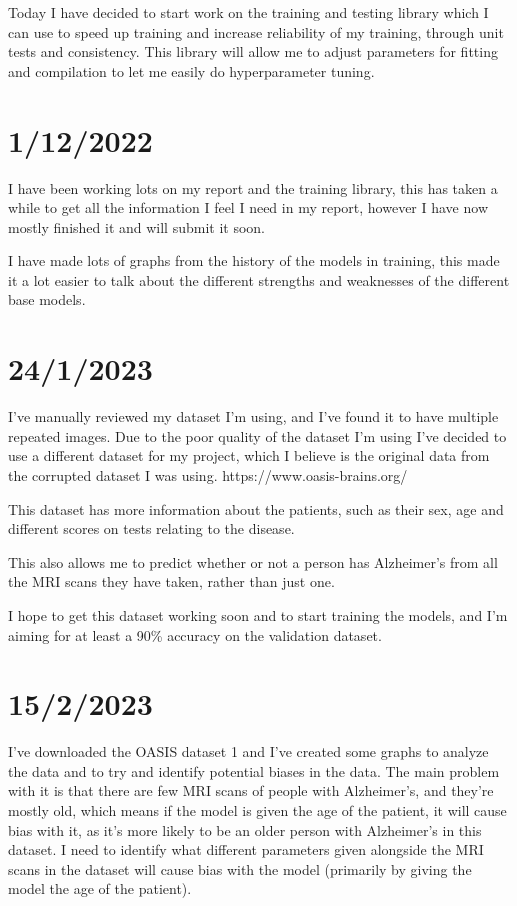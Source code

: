 \documentclass[]{final_report}
\begin{document}
Today I have decided to start work on the training and testing library which I can use to speed up training and increase reliability of my training, through unit tests and consistency.
This library will allow me to adjust parameters for fitting and compilation to let me easily do hyperparameter tuning.

\section*{1/12/2022}

I have been working lots on my report and the training library, this has taken a while to get all the information I feel I need in my report, however I have now mostly finished it and will submit it soon.

I have made lots of graphs from the history of the models in training, this made it a lot easier to talk about the different strengths and weaknesses of the different base models.

\section*{24/1/2023}
I've manually reviewed my dataset I'm using, and I've found it to have multiple repeated images. Due to the poor quality of the dataset I'm using I've decided to use a different dataset for my project, which I believe is the original data from the corrupted dataset I was using.
https://www.oasis-brains.org/

This dataset has more information about the patients, such as their sex, age and different scores on tests relating to the disease.

This also allows me to predict whether or not a person has Alzheimer's from all the MRI scans they have taken, rather than just one.

I hope to get this dataset working soon and to start training the models, and I'm aiming for at least a 90\% accuracy on the validation dataset.

\section*{15/2/2023}

I've downloaded the OASIS dataset 1 and I've created some graphs to analyze the data and to try and identify potential biases in the data. The main problem with it is that there are few MRI scans of people with Alzheimer's, and they're mostly old, which means if the model is given the age of the patient, it will cause bias with it, as it's more likely to be an older person with Alzheimer's in this dataset. I need to identify what different parameters given alongside the MRI scans in the dataset will cause bias with the model (primarily by giving the model the age of the patient).
\end{document}
